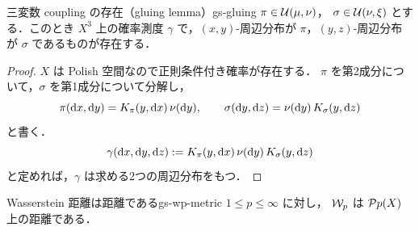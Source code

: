 \begin{lemma}{三変数 coupling の存在（gluing lemma）}{gs-gluing}
  $\pi\in\mathcal{U}(\mu,\nu)$，
  $\sigma\in\mathcal{U}(\nu,\xi)$ とする．このとき $X^3$ 上の確率測度
  $\gamma$ で，$(x,y)$-周辺分布が $\pi$，$(y,z)$-周辺分布が $\sigma$
  であるものが存在する．
\end{lemma}

\begin{proof}
  $X$ は Polish 空間なので正則条件付き確率が存在する．
  $\pi$ を第2成分について，$\sigma$ を第1成分について分解し，
  \[
    \pi(\mathrm{d} x,\mathrm{d} y)=K_\pi(y,\mathrm{d} x)\,\nu(\mathrm{d} y),
    \qquad
    \sigma(\mathrm{d} y,\mathrm{d} z)=\nu(\mathrm{d} y)\,K_\sigma(y,\mathrm{d} z)
  \]
  と書く．
  \[
    \gamma(\mathrm{d} x,\mathrm{d} y,\mathrm{d} z)
    :=
    K_\pi(y,\mathrm{d} x)\,\nu(\mathrm{d} y)\,K_\sigma(y,\mathrm{d} z)
  \]
  と定めれば，$\gamma$ は求める2つの周辺分布をもつ．
\end{proof}

\begin{proposition}{Wasserstein 距離は距離である}{gs-wp-metric}
  $1\leq p\leq\infty$ に対し，
  $\mathcal{W}_p$ は $\mathcal{P}{p}(X)$ 上の距離である．
\end{proposition}


